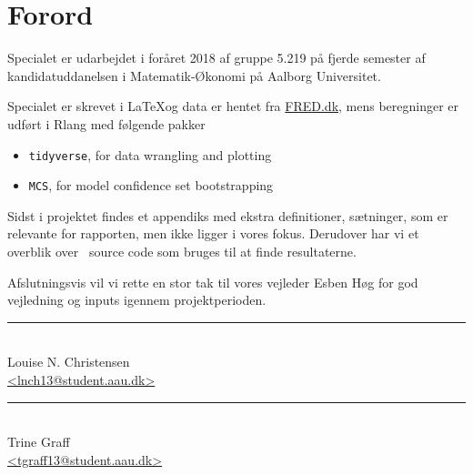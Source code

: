 \chapter{Forord} \label{ch:forord}
Specialet er udarbejdet i foråret 2018 af gruppe 5.219 på fjerde semester af kandidatuddanelsen i Matematik-Økonomi på Aalborg Universitet.

Specialet er skrevet i \LaTeX og data er hentet fra \url{FRED.dk}, mens beregninger er udført i Rlang  med følgende pakker

\begin{itemize}
	\item \texttt{tidyverse}, for data wrangling and plotting
	\item \texttt{MCS}, for model confidence set bootstrapping
\end{itemize}

Sidst i projektet findes et appendiks med ekstra definitioner, sætninger, som er relevante for rapporten, men ikke ligger i vores fokus.
Derudover har vi et overblik over \Rlang ~source code som bruges til at finde resultaterne. 

Afslutningsvis vil vi rette en stor tak til vores vejleder Esben Høg for god vejledning og inputs igennem projektperioden.

%
%
\vfill
%

\begin{center}
\begin{minipage}[b]{0.45\textwidth}
 \centering
 \rule{\textwidth}{0.5pt}\\
  Louise N. Christensen\\
 {\footnotesize\ttfamily \href{mailto:lnch13@student.aau.dk}{<lnch13@student.aau.dk>}}
\end{minipage}
\hfill
\begin{minipage}[b]{0.45\textwidth}
 \centering
 \rule{\textwidth}{0.5pt}\\
  Trine Graff\\
 {\footnotesize\ttfamily \href{mailto:tgraff13@student.aau.dk}{<tgraff13@student.aau.dk>}}
\end{minipage}
\end{center}

